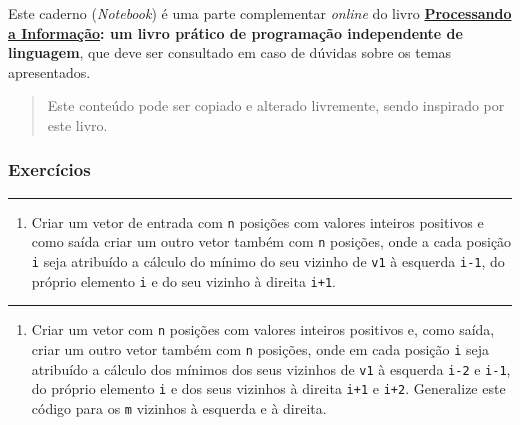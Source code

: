 \documentclass[12pt,a4paper]{article}
\renewcommand{\linethickness}{0.05em}
\providecommand{\tightlist}{%
      \setlength{\itemsep}{0pt}\setlength{\parskip}{0pt}}
\begin{document}
Este caderno (\emph{Notebook}) é uma parte complementar \emph{online} do
livro
\textbf{\href{https://editora.ufabc.edu.br/matematica-e-ciencias-da-computacao/58-processando-a-informacao}{Processando
a Informação}: um livro prático de programação independente de
linguagem}, que deve ser consultado em caso de dúvidas sobre os temas
apresentados.

\begin{quote}
Este conteúdo pode ser copiado e alterado livremente, sendo inspirado
por este livro.
\end{quote}

    \hypertarget{exercuxedcios}{%
\subsubsection{Exercícios}\label{exercuxedcios}}

    \begin{center}\rule{0.5\linewidth}{\linethickness}\end{center}

\begin{enumerate}
\def\labelenumi{\arabic{enumi}.}
\tightlist
\item
  Criar um vetor de entrada com \texttt{n} posições com valores inteiros
  positivos e como saída criar um outro vetor também com \texttt{n}
  posições, onde a cada posição \texttt{i} seja atribuído a cálculo do
  mínimo do seu vizinho de \texttt{v1} à esquerda \texttt{i-1}, do
  próprio elemento \texttt{i} e do seu vizinho à direita \texttt{i+1}.
\end{enumerate}

    \begin{center}\rule{0.5\linewidth}{\linethickness}\end{center}

\begin{enumerate}
\def\labelenumi{\arabic{enumi}.}
\setcounter{enumi}{1}
\tightlist
\item
  Criar um vetor com \texttt{n} posições com valores inteiros positivos
  e, como saída, criar um outro vetor também com \texttt{n} posições,
  onde em cada posição \texttt{i} seja atribuído a cálculo dos mínimos
  dos seus vizinhos de \texttt{v1} à esquerda \texttt{i-2} e
  \texttt{i-1}, do próprio elemento \texttt{i} e dos seus vizinhos à
  direita \texttt{i+1} e \texttt{i+2}. Generalize este código para os
  \texttt{m} vizinhos à esquerda e à direita.
\end{enumerate}
\end{document}
